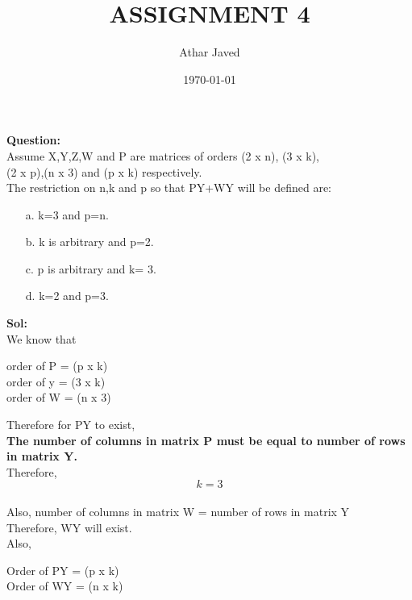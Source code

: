 \documentclass{article}
\begin{document}
\title{ASSIGNMENT 4 }
\author{Athar Javed}
\date{\today}
\maketitle
\flushleft
\textbf{Question:}\\
\hspace{2cm}Assume X,Y,Z,W and P are matrices of orders (2 x n), (3 x k),\\
\vspace{0.2cm}
(2 x p),(n x 3) and (p x k) respectively.\\
\vspace{0.5 cm}The restriction on n,k and p so that PY+WY will be defined are:\\
\begin{enumerate}
\item[a.]k=3 and p=n.
\item[b.]k is arbitrary and p=2.
\item[c.]p is arbitrary and k= 3.
\item[d.]k=2 and p=3.
\end{enumerate}
\vspace{0.2cm}
\textbf{Sol:}\\
\hspace{2cm} We know that\\
\begin{center}
 order of P = (p x k) \\
 \vspace{0.2cm}
 order of y = (3 x k)\\
 \vspace{0.2cm}
 order of W = (n x 3)\\
 
 \end{center}
Therefore for PY to exist,\\
\vspace{0.2cm}
\textbf{The number of columns in matrix P must be equal to number of rows in matrix Y.}\\
\vspace{0.2cm}
Therefore,
$$k = 3$$ \\
Also, number of columns in matrix W = number of rows in matrix Y\\
\vspace{0.2cm}
Therefore, WY will exist.\\
\vspace{0.2cm}
Also,\\
\begin{center}
\vspace{0.2cm}
Order of PY = (p x k)\\
\vspace{0.2cm}
Order of WY = (n x k)\\
\end{center}
\end{document}
